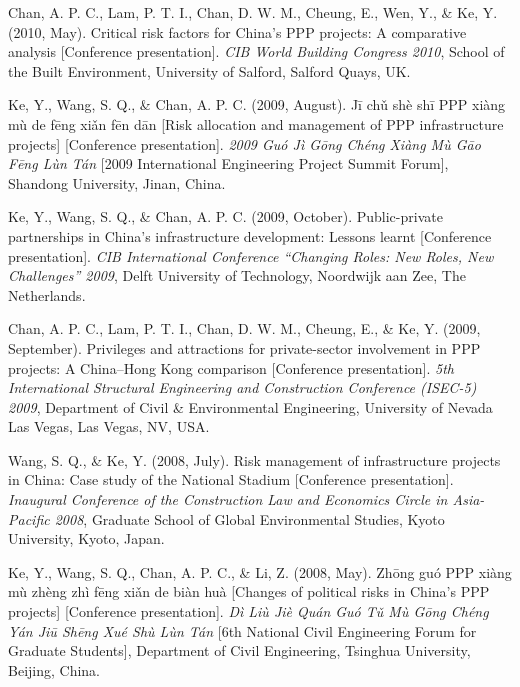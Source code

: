 \documentclass[11pt,a4paper]{report} %
\begin{document}
\begin{tablist}
        \item[2010] \tab{}Chan, A. P. C., Lam, P. T. I., Chan, D. W. M., Cheung, E., Wen, Y., \& Ke, Y. (2010, May). Critical risk factors for China's PPP projects: A comparative analysis [Conference presentation]. \textit{CIB World Building Congress 2010}, School of the Built Environment, University of Salford, Salford Quays, UK.
        
        \item[2009] \tab{}Ke, Y., Wang, S. Q., \& Chan, A. P. C. (2009, August). Jī chǔ shè shī PPP xiàng mù de fēng xiǎn fēn dān [Risk allocation and management of PPP infrastructure projects] [Conference presentation]. \textit{2009 Guó Jì Gōng Chéng Xiàng Mù Gāo Fēng Lùn Tán} [2009 International Engineering Project Summit Forum], Shandong University, Jinan, China.
        
        \item[2009] \tab{}Ke, Y., Wang, S. Q., \& Chan, A. P. C. (2009, October). Public-private partnerships in China's infrastructure development: Lessons learnt [Conference presentation]. \textit{CIB International Conference “Changing Roles: New Roles, New Challenges” 2009}, Delft University of Technology, Noordwijk aan Zee, The Netherlands.
        
        \item[2009] \tab{}Chan, A. P. C., Lam, P. T. I., Chan, D. W. M., Cheung, E., \& Ke, Y. (2009, September). Privileges and attractions for private-sector involvement in PPP projects: A China–Hong Kong comparison [Conference presentation]. \textit{5th International Structural Engineering and Construction Conference (ISEC-5) 2009}, Department of Civil \& Environmental Engineering, University of Nevada Las Vegas, Las Vegas, NV, USA.
        
        \item[2008] \tab{}Wang, S. Q., \& Ke, Y. (2008, July). Risk management of infrastructure projects in China: Case study of the National Stadium [Conference presentation]. \textit{Inaugural Conference of the Construction Law and Economics Circle in Asia-Pacific 2008}, Graduate School of Global Environmental Studies, Kyoto University, Kyoto, Japan.
        
        \item[2008] \tab{}Ke, Y., Wang, S. Q., Chan, A. P. C., \& Li, Z. (2008, May). Zhōng guó PPP xiàng mù zhèng zhì fēng xiǎn de biàn huà [Changes of political risks in China's PPP projects] [Conference presentation]. \textit{Dì Liù Jiè Quán Guó Tǔ Mù Gōng Chéng Yán Jiū Shēng Xué Shù Lùn Tán} [6th National Civil Engineering Forum for Graduate Students], Department of Civil Engineering, Tsinghua University, Beijing, China.
        

\end{tablist}
\end{document}
